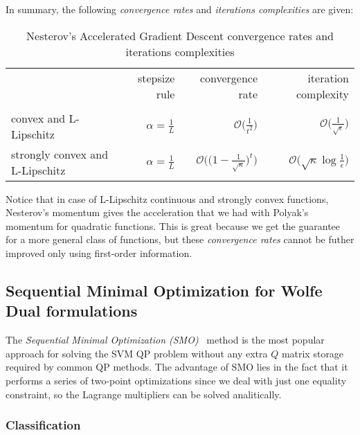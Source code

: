 
In summary, the following \emph{convergence rates} and \emph{iterations complexities} are given:

\begin{table}[H]
\centering
\caption{Nesterov's Accelerated Gradient Descent convergence rates and iterations complexities}
\label{nesterov_gradient_rates}
\begin{tabular}{lrrr}
\toprule
	& stepsize rule & convergence rate & iteration complexity \\
 	& 		& 		& 		\\
\midrule
convex and L-Lipschitz & $\displaystyle \alpha = \frac{1}{L}$ & $\displaystyle \mathcal{O}\Bigg(\frac{1}{t^2}\Bigg)$ & $\displaystyle \mathcal{O}\Bigg(\frac{1}{\sqrt{\epsilon}}\Bigg)$ \\
strongly convex and L-Lipschitz & $\displaystyle \alpha = \frac{1}{L}$ & $\displaystyle \mathcal{O}\Bigg(\Bigg(1 - \frac{1}{\sqrt{\kappa}}\Bigg)^t\Bigg)$ & $\displaystyle \mathcal{O}\Bigg(\sqrt{\kappa}\log \frac{1}{\epsilon}\Bigg)$ \\
\bottomrule
\end{tabular}
\end{table}

Notice that in case of L-Lipschitz continuous and strongly convex functions, Nesterov's momentum gives the acceleration that we had with Polyak’s momentum for quadratic functions. This is great because we get the guarantee for a more general class of functions, but these \emph{convergence rates} cannot be futher improved only using first-order information.

\pagebreak

\subsection{Sequential Minimal Optimization for Wolfe Dual formulations}

The \emph{Sequential Minimal Optimization (SMO)}~\cite{platt1998sequential} method is the most popular approach for solving the SVM QP problem without any extra $Q$ matrix storage required by common QP methods. The advantage of SMO lies in the fact that it performs a series of two-point optimizations since we deal with just one equality constraint, so the Lagrange multipliers can be solved analitically.

\subsubsection{Classification}

